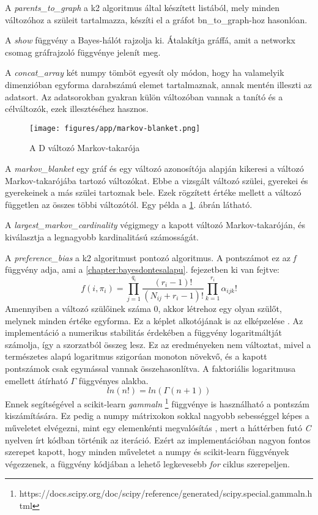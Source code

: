A \emph{parents\_to\_graph} a k2 algoritmus által készített listából, mely minden változóhoz a szüleit tartalmazza, készíti el a gráfot bn\_to\_graph-hoz hasonlóan.

A \emph{show} függvény a Bayes-hálót rajzolja ki. Átalakítja gráffá, amit a networkx csomag gráfrajzoló függvénye jelenít meg.

A \emph{concat\_array} két numpy tömböt egyesít oly módon, hogy ha valamelyik dimenzióban egyforma darabszámú elemet tartalmaznak, annak mentén illeszti az adatsort. Az adatsorokban gyakran külön változóban vannak a tanító és a célváltozók, ezek illesztéséhez hasznos.

\begin{figure}[htp]
    \centering
    \texttt{[image: figures/app/markov-blanket.png]}
    \caption{A D változó Markov-takarója}
    \label{fig:markov-blanket}
\end{figure}

A \emph{markov\_blanket} egy gráf és egy változó azonosítója alapján kikeresi a változó Markov-takarójába tartozó változókat. Ebbe a vizsgált változó szülei, gyerekei és gyerekeinek a más szülei tartoznak bele. Ezek rögzített értéke mellett a változó független az összes többi változótól. Egy példa a \ref{fig:markov-blanket}. ábrán látható.

A \emph{largest\_markov\_cardinality} végigmegy a kapott változó Markov-takaróján, és kiválasztja a legnagyobb kardinalitású számosságát.

A \emph{preference\_bias} a k2 algoritmust pontozó algoritmus. A pontszámot ez az \emph{f} függvény adja, ami a \ref{chapter:bayesdontesalapu}. fejezetben ki van fejtve:
$$ f(i, \pi_{i}) =
\prod_{j = 1}^{q_{i}} \frac{(r_{i} - 1)!}{(N_{ij} + r_{i} - 1)!}
\prod_{k = 1}^{r_{i}} \alpha_{ijk}!$$
Amennyiben a változó szülőinek száma 0, akkor létrehoz egy olyan szülőt, melynek minden értéke egyforma. Ez a képlet alkotójának is az elképzelése \cite{cooper1992bayesian}. Az implementáció a numerikus stabilitás érdekében a függvény logaritmáltját számolja, így a szorzatból összeg lesz. Ez az eredményeken nem változtat, mivel a természetes alapú logaritmus szigorúan monoton növekvő, és a kapott pontszámok csak egymással vannak összehasonlítva. A faktoriális logaritmusa emellett átírható $\Gamma$ függvényes alakba.
$$ ln(n!) = ln(\Gamma(n + 1))$$
Ennek segítségével a scikit-learn \emph{gammaln} \footnote{https://docs.scipy.org/doc/scipy/reference/generated/scipy.special.gammaln.html} függvénye is használható a pontszám kiszámítására. Ez pedig a numpy mátrixokon sokkal nagyobb sebességgel képes a műveletet elvégezni, mint egy elemenkénti megvalósítás \cite{smith2015cython}, mert a háttérben futó \emph{C} nyelven írt kódban történik az iteráció. Ezért az implementációban nagyon fontos szerepet kapott, hogy minden műveletet a numpy és scikit-learn függvények végezzenek, a függvény kódjában a lehető legkevesebb \emph{for} ciklus szerepeljen.

